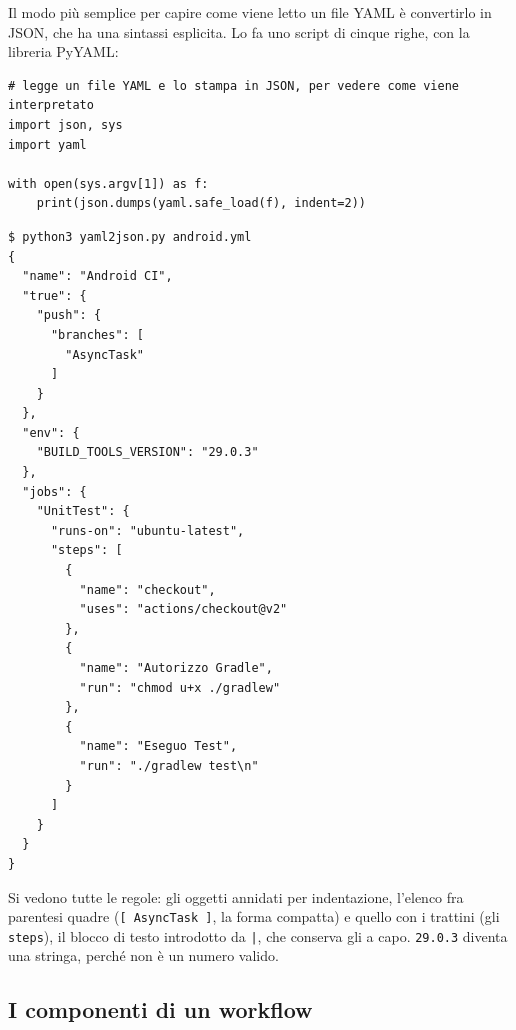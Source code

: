 Il modo più semplice per capire come viene letto un file YAML è convertirlo in JSON, che ha una sintassi esplicita. Lo
fa uno script di cinque righe, con la libreria PyYAML:

\begin{lstlisting}[style=plain, name=yaml2json.py]
# legge un file YAML e lo stampa in JSON, per vedere come viene interpretato
import json, sys
import yaml

with open(sys.argv[1]) as f:
    print(json.dumps(yaml.safe_load(f), indent=2))
\end{lstlisting}

\begin{lstlisting}[style=shell, name=Terminale]
$ python3 yaml2json.py android.yml
{
  "name": "Android CI",
  "true": {
    "push": {
      "branches": [
        "AsyncTask"
      ]
    }
  },
  "env": {
    "BUILD_TOOLS_VERSION": "29.0.3"
  },
  "jobs": {
    "UnitTest": {
      "runs-on": "ubuntu-latest",
      "steps": [
        {
          "name": "checkout",
          "uses": "actions/checkout@v2"
        },
        {
          "name": "Autorizzo Gradle",
          "run": "chmod u+x ./gradlew"
        },
        {
          "name": "Eseguo Test",
          "run": "./gradlew test\n"
        }
      ]
    }
  }
}
\end{lstlisting}

Si vedono tutte le regole: gli oggetti annidati per indentazione, l'elenco fra parentesi quadre (\texttt{[ AsyncTask ]},
la forma compatta) e quello con i trattini (gli \texttt{steps}), il blocco di testo introdotto da \texttt{|}, che
conserva gli a capo. \texttt{29.0.3} diventa una stringa, perché non è un numero valido.


\subsection{I componenti di un workflow}

